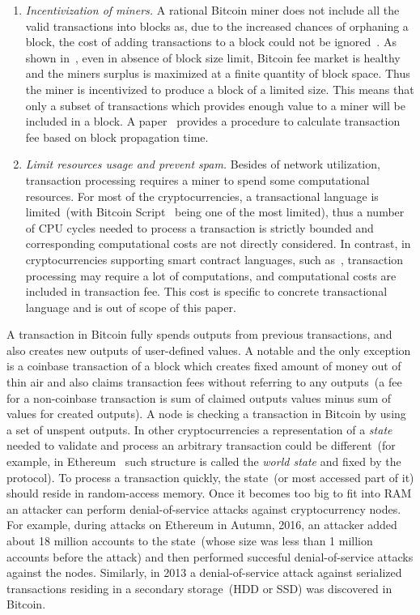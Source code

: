 \documentclass[]{llncs}   %
\begin{document}
\begin{enumerate}
  \item{\em Incentivization of miners.} A rational Bitcoin miner does not include all the valid transactions into blocks as, due to the increased chances of orphaning a block, the cost of adding transactions to a block could not be ignored~\cite{andersen2013,rizun2015transaction}. As shown in~\cite{rizun2015transaction}, even in absence of block size limit, Bitcoin fee market is healthy and the miners surplus is maximized at a finite quantity of block space. Thus the miner is incentivized to produce a block of a limited size. This means that only a subset of transactions which provides enough value to a miner will be included in a block. A paper~\cite{rizun2015transaction} provides a procedure to calculate transaction fee based on block propagation time.

  \item{\em Limit resources usage and prevent spam. } Besides of network utilization, transaction processing requires a miner to spend some computational resources. For most of the cryptocurrencies, a transactional language is limited~(with Bitcoin Script~\cite{script} being one of the most limited), thus a number of CPU cycles needed to process a transaction is strictly bounded and corresponding computational costs are not directly considered. In contrast, in cryptocurrencies supporting smart contract languages, such as~\cite{seijas2016scripting,tezosScript,solidity}, transaction processing may require a lot of computations, and computational costs are included in transaction fee. This cost is specific to concrete transactional language and is out of scope of this paper.
\end{enumerate}

A transaction in Bitcoin fully spends outputs from previous transactions, and also creates new outputs of user-defined values. A notable and the only exception is a coinbase transaction of a block which creates fixed amount of money out of thin air and also claims transaction fees without referring to any outputs~(a fee for a non-coinbase transaction is sum of claimed outputs values minus sum of values for created outputs). A node is checking a transaction in Bitcoin by using a set of unspent outputs. In other cryptocurrencies a representation of a {\em state} needed to validate and process an arbitrary transaction could be different~(for example, in Ethereum~\cite{ethyp} such structure is called the {\em world state} and fixed by the protocol). To process a transaction quickly, the state~(or most accessed part of it) should reside in random-access memory. Once it becomes too big to fit into RAM an attacker can perform denial-of-service attacks against cryptocurrency nodes. For example, during attacks on Ethereum in Autumn, 2016, an attacker added about 18 million accounts to the state~(whose size was less than 1 million accounts before the attack) and then performed succesful denial-of-service attacks against the nodes\cite{eth2016dos}. Similarly, in 2013 a denial-of-service attack against serialized transactions residing in a secondary storage~(HDD or SSD) was discovered in Bitcoin\cite{vasek2014empirical}.
\end{document}
